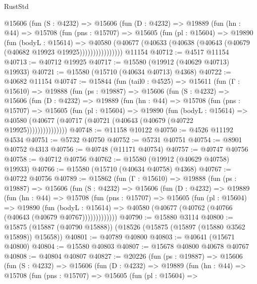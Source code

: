 \begin{lexlean}{RustStd}
\begin{coremodule}
          @15606
            (fun (S : @4232) =>
            @15606
              (fun (D : @4232) =>
              @19889
                (fun (hn : @44) =>
                @15708
                  (fun (pns : @15707) =>
                  @15605
                    (fun (pl : @15604) =>
                    @19890
                      (fun (bodyL : @15614) =>
                      @40580
                        (@40677
                          (@40633 (@40638 (@40643 (@40679 (@40682 @19923 @19925))))))))))))))))
    @11154
@40712 := @4517 @11154
@40713 := @40712 @19925
@40717 := @15580 (@19912 (@40629 @40713) @19933)
@40721 := @15580 (@15710 (@40634 @40713) @4368)
@40722 := @40682 @11154
@40747 := @15844
    (fun (tail0 : @4525) =>
    @15611
      (fun (Γ : @15610) =>
      @19888
        (fun (ps : @19887) =>
        @15606
          (fun (S : @4232) =>
          @15606
            (fun (D : @4232) =>
            @19889
              (fun (hn : @44) =>
              @15708
                (fun (pns : @15707) =>
                @15605
                  (fun (pl : @15604) =>
                  @19890
                    (fun (bodyL : @15614) =>
                    @40580 (@40677 (@40717 (@40721 (@40643 (@40679 (@40722 @19925)))))))))))))))
@40748 := @11158 @10122
@40750 := @4526 @11192 @4534
@40751 := @5732 @40750
@40752 := @5731 @40751
@40754 := @8901 @40752 @4313
@40756 := @40748 (@11171 @40754)
@40757 := @40747 @40756
@40758 := @40712 @40756
@40762 := @15580 (@19912 (@40629 @40758) @19933)
@40766 := @15580 (@15710 (@40634 @40758) @4368)
@40767 := @40722 @40756
@40789 := @15862
    (fun (Γ : @15610) =>
    @19888
      (fun (ps : @19887) =>
      @15606
        (fun (S : @4232) =>
        @15606
          (fun (D : @4232) =>
          @19889
            (fun (hn : @44) =>
            @15708
              (fun (pns : @15707) =>
              @15605
                (fun (pl : @15604) =>
                @19890
                  (fun (bodyL : @15614) =>
                  @40580 (@40677 (@40762 (@40766 (@40643 (@40679 @40767)))))))))))))
@40790 := @15880 @3114
@40800 := @15875 (@15887 (@40790 @15888)) (@18526 (@15875 (@15897 (@15880 @3562 @15898)) @15658))
@40801 := @40789 @40800
@40803 := @40641 (@15671 @40800)
@40804 := @15580 @40803
@40807 := @15678 @40800 @40678 @40767
@40808 := @40804 @40807
@40827 := @20226
    (fun (ps : @19887) =>
    @15606
      (fun (S : @4232) =>
      @15606
        (fun (D : @4232) =>
        @19889
          (fun (hn : @44) =>
          @15708
            (fun (pns : @15707) =>
            @15605
              (fun (pl : @15604) =>

\end{coremodule}
\end{lexlean}
